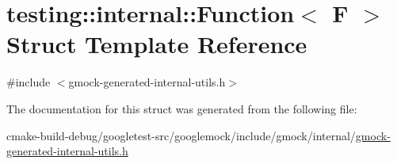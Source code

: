 \hypertarget{structtesting_1_1internal_1_1Function}{}\section{testing\+::internal\+::Function$<$ F $>$ Struct Template Reference}
\label{structtesting_1_1internal_1_1Function}


{\ttfamily \#include $<$gmock-\/generated-\/internal-\/utils.\+h$>$}



The documentation for this struct was generated from the following file\+:\begin{DoxyCompactItemize}
\item 
cmake-\/build-\/debug/googletest-\/src/googlemock/include/gmock/internal/\mbox{\hyperlink{gmock-generated-internal-utils_8h}{gmock-\/generated-\/internal-\/utils.\+h}}\end{DoxyCompactItemize}
